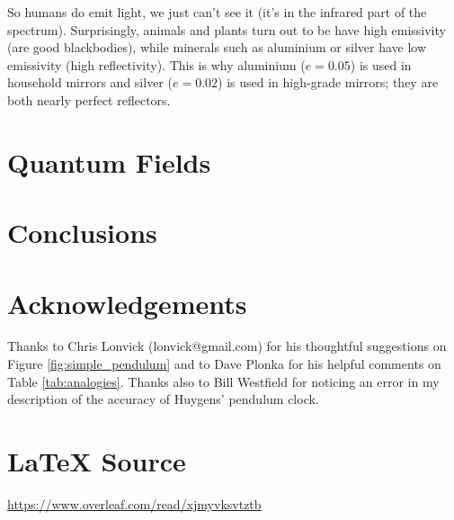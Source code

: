\documentclass{article}
\theoremstyle{definition}
\begin{document}
\bigskip
\noindent
So humans do emit light, we just can't see it (it's in the
infrared part of the spectrum).  Surprisingly, animals and plants
turn out to be have high emissivity (are good blackbodies),
while minerals such as aluminium or silver have low emissivity
(high reflectivity). This is why aluminium ($e = 0.05$) is used
in household mirrors and silver ($e = 0.02$) is used in
high-grade mirrors; they are both nearly perfect reflectors.

\section{Quantum Fields}
\label{sec:quantum_fields}

\section{Conclusions}
\label{sec:conclusions}


\section*{Acknowledgements}
Thanks to Chris Lonvick (lonvick@gmail.com) for his thoughtful
suggestions on Figure \ref{fig:simple_pendulum} and to
Dave Plonka for his helpful comments on Table
\ref{tab:analogies}. Thanks also to Bill Westfield for
noticing an error in my description of the accuracy of
Huygens' pendulum clock.
%
%
\section*{\LaTeX \hspace{0.10 mm} Source}
\url{https://www.overleaf.com/read/xjmyvksvtztb}
%
%
%


%
%
\end{document}
